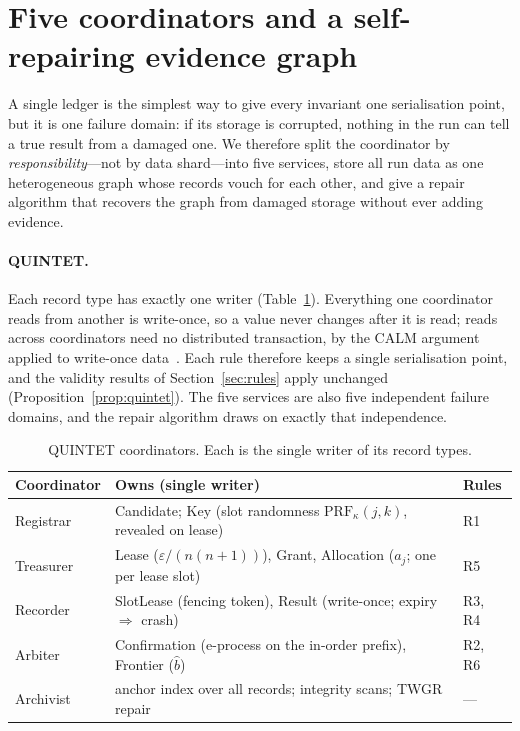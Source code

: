 \documentclass[11pt]{article}
\theoremstyle{definition}
\newcommand{\bhat}{\hat b}
\begin{document}
\section{Five coordinators and a self-repairing evidence graph}\label{sec:quintet}

A single ledger is the simplest way to give every invariant one serialisation point, but it is one failure domain: if its storage is corrupted, nothing in the run can tell a true result from a damaged one. We therefore split the coordinator by \emph{responsibility}---not by data shard---into five services, store all run data as one heterogeneous graph whose records vouch for each other, and give a repair algorithm that recovers the graph from damaged storage without ever adding evidence.

\paragraph{QUINTET.} Each record type has exactly one writer (Table~\ref{tab:quintet}). Everything one coordinator reads from another is write-once, so a value never changes after it is read; reads across coordinators need no distributed transaction, by the CALM argument applied to write-once data~\cite{hellerstein2020calm}. Each rule therefore keeps a single serialisation point, and the validity results of Section~\ref{sec:rules} apply unchanged (Proposition~\ref{prop:quintet}). The five services are also five independent failure domains, and the repair algorithm draws on exactly that independence.

\begin{table}[!htbp]\centering\small
\caption{QUINTET coordinators. Each is the single writer of its record types.}\label{tab:quintet}
\begin{tabularx}{\linewidth}{lXl}
\toprule
Coordinator & Owns (single writer) & Rules \\\midrule
Registrar & Candidate; Key (slot randomness $\mathrm{PRF}_\kappa(j,k)$, revealed on lease) & R1 \\
Treasurer & Lease ($\varepsilon/(n(n+1))$), Grant, Allocation ($a_j$; one per lease slot) & R5 \\
Recorder & SlotLease (fencing token), Result (write-once; expiry $\Rightarrow$ crash) & R3, R4 \\
Arbiter & Confirmation (e-process on the in-order prefix), Frontier ($\bhat$) & R2, R6 \\
Archivist & anchor index over all records; integrity scans; TWGR repair & --- \\
\bottomrule\end{tabularx}
\end{table}
\end{document}
